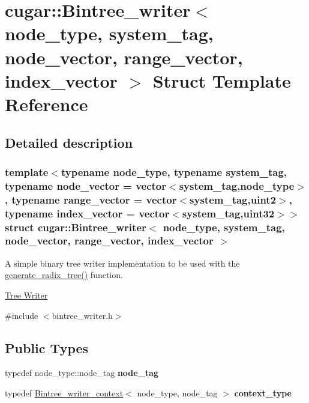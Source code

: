 \hypertarget{structcugar_1_1_bintree__writer}{}\section{cugar\+:\+:Bintree\+\_\+writer$<$ node\+\_\+type, system\+\_\+tag, node\+\_\+vector, range\+\_\+vector, index\+\_\+vector $>$ Struct Template Reference}
\label{structcugar_1_1_bintree__writer}


\subsection{Detailed description}
\subsubsection*{template$<$typename node\+\_\+type, typename system\+\_\+tag, typename node\+\_\+vector = vector$<$system\+\_\+tag,node\+\_\+type$>$, typename range\+\_\+vector = vector$<$system\+\_\+tag,uint2$>$, typename index\+\_\+vector = vector$<$system\+\_\+tag,uint32$>$$>$\newline
struct cugar\+::\+Bintree\+\_\+writer$<$ node\+\_\+type, system\+\_\+tag, node\+\_\+vector, range\+\_\+vector, index\+\_\+vector $>$}

A simple binary tree writer implementation to be used with the \hyperlink{group__radixtree_gafa925282e2b6e8bd87c1a00c1f1e6807}{generate\+\_\+radix\+\_\+tree()} function.

\hyperlink{group__radixtree_TreeWriterAnchor}{Tree Writer} 

{\ttfamily \#include $<$bintree\+\_\+writer.\+h$>$}

\subsection*{Public Types}
\begin{DoxyCompactItemize}
\item 
\mbox{\label{structcugar_1_1_bintree__writer_a86bf5533920acd9e5dc32d656c2e6973}} 
typedef node\+\_\+type\+::node\+\_\+tag {\bfseries node\+\_\+tag}
\item 
\mbox{\label{structcugar_1_1_bintree__writer_af67f19d76858ac421021017924a644de}} 
typedef \hyperlink{structcugar_1_1_bintree__writer__context}{Bintree\+\_\+writer\+\_\+context}$<$ node\+\_\+type, node\+\_\+tag $>$ {\bfseries context\+\_\+type}
\end{DoxyCompactItemize}
